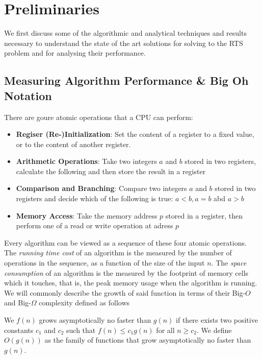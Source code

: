 \chapter{Preliminaries}

We first discuss some of the algorithmic and analytical techniques and results necessary to understand the state of the art solutions for solving to the RTS problem and for analysing their performance.

\section{Measuring Algorithm Performance \& Big Oh Notation}

There are goure atomic operations that a CPU can perform: 
\begin{itemize}
    \item \textbf{Regiser (Re-)Initialization}: Set the content of a register to a fixed value, or to the content of another register.
    \item \textbf{Arithmetic Operations}: Take two integers $a$ and $b$ stored in two registers, calculate the following and then store the result in a register
    \item \textbf{Comparison and Branching}: Compare two integers $a$ and $b$ stored in two registers and decide which of the following is true: $a<b, a=b$ abd $a>b$
    \item \textbf{Memory Access}: Take the memory address $p$ stored in a register, then perform one of a read or write operation at adress $p$
\end{itemize}
Every algorithm can be viewed as a sequence of these four atomic operations. The \textit{running time cost} of an algorithm is the measured by the number of operations in the sequence, as a function of the size of the input $n$. The \textit{space consumption} of an algorithm is the measured by the footprint of memory cells which it touches, that is, the peak memory usage when the algorithm is running. We will commonly describe the growth of said function in terms of their Big-$O$ and Big-$\Omega$ complexity defined as follows

\begin{definition}
    We $f(n)$ grows asymptotically no faster than $g(n)$ if there exists two positive constants $c_1$ and $c_2$ such that $f(n)\leq c_1 g(n)$ for all $n\geq c_2$. We define $O(g(n))$ as the family of functions that grow asymptotically no faster than $g(n)$.
\end{definition}

